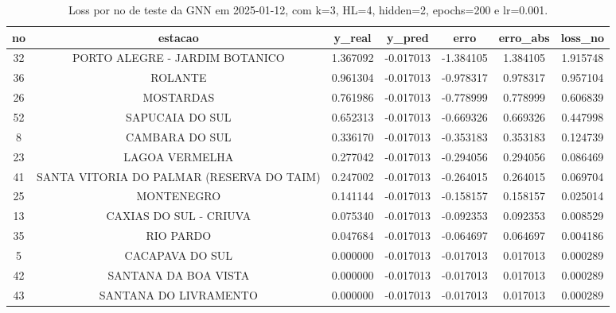 \begin{table}[h]
\centering
\caption{Loss por no de teste da GNN em 2025-01-12, com k=3, HL=4, hidden=2, epochs=200 e lr=0.001.}
\label{tab:gnn_loss_k3_hl4_h2_e200_d20250112}
\begin{tabular}{ccccccc}
\toprule
no & estacao & y\_real & y\_pred & erro & erro\_abs & loss\_no \\
\midrule
32 & PORTO ALEGRE - JARDIM BOTANICO & 1.367092 & -0.017013 & -1.384105 & 1.384105 & 1.915748 \\
36 & ROLANTE & 0.961304 & -0.017013 & -0.978317 & 0.978317 & 0.957104 \\
26 & MOSTARDAS & 0.761986 & -0.017013 & -0.778999 & 0.778999 & 0.606839 \\
52 & SAPUCAIA DO SUL & 0.652313 & -0.017013 & -0.669326 & 0.669326 & 0.447998 \\
8 & CAMBARA DO SUL & 0.336170 & -0.017013 & -0.353183 & 0.353183 & 0.124739 \\
23 & LAGOA VERMELHA & 0.277042 & -0.017013 & -0.294056 & 0.294056 & 0.086469 \\
41 & SANTA VITORIA DO PALMAR (RESERVA DO TAIM) & 0.247002 & -0.017013 & -0.264015 & 0.264015 & 0.069704 \\
25 & MONTENEGRO & 0.141144 & -0.017013 & -0.158157 & 0.158157 & 0.025014 \\
13 & CAXIAS DO SUL - CRIUVA & 0.075340 & -0.017013 & -0.092353 & 0.092353 & 0.008529 \\
35 & RIO PARDO & 0.047684 & -0.017013 & -0.064697 & 0.064697 & 0.004186 \\
5 & CACAPAVA DO SUL & 0.000000 & -0.017013 & -0.017013 & 0.017013 & 0.000289 \\
42 & SANTANA DA BOA VISTA & 0.000000 & -0.017013 & -0.017013 & 0.017013 & 0.000289 \\
43 & SANTANA DO LIVRAMENTO & 0.000000 & -0.017013 & -0.017013 & 0.017013 & 0.000289 \\
\bottomrule
\end{tabular}
\end{table}

